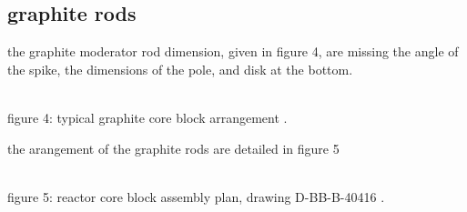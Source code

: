 \documentclass{article}
\begin{document}
\begin{preview}
\section{graphite rods}
the graphite moderator rod dimension, given in figure 4, are missing the angle of the spike, the dimensions of the pole, and disk at the bottom.
\begin{center}
  \centering
  \\
  figure 4: typical graphite core block arrangement \parencite[figure 2]{ornl-tm-3229}.
\end{center}

the arangement of the graphite rods are detailed in figure 5
\begin{center}
  \centering
  \\
  figure 5: reactor core block assembly plan, drawing D-BB-B-40416 \parencite[page 10-11]{ornl-tm-4174}.
\end{center}


\printbibliography

\end{preview}
\end{document}
